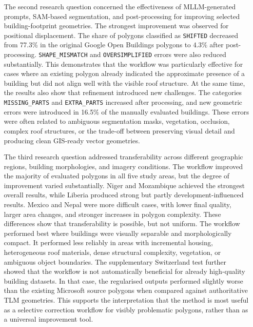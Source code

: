 The second research question concerned the effectiveness of MLLM-generated prompts, SAM-based segmentation, and post-processing for improving selected building-footprint geometries. The strongest improvement was observed for positional displacement. The share of polygons classified as \texttt{SHIFTED} decreased from 77.3\% in the original Google Open Buildings polygons to 4.3\% after post-processing. \texttt{SHAPE\_MISMATCH} and \texttt{OVERSIMPLIFIED} errors were also reduced substantially. This demonstrates that the workflow was particularly effective for cases where an existing polygon already indicated the approximate presence of a building but did not align well with the visible roof structure. At the same time, the results also show that refinement introduced new challenges. The categories \texttt{MISSING\_PARTS} and \texttt{EXTRA\_PARTS} increased after processing, and new geometric errors were introduced in 16.5\% of the manually evaluated buildings. These errors were often related to ambiguous segmentation masks, vegetation, occlusion, complex roof structures, or the trade-off between preserving visual detail and producing clean GIS-ready vector geometries.

The third research question addressed transferability across different geographic regions, building morphologies, and imagery conditions. The workflow improved the majority of evaluated polygons in all five study areas, but the degree of improvement varied substantially. Niger and Mozambique achieved the strongest overall results, while Liberia produced strong but partly development-influenced results. Mexico and Nepal were more difficult cases, with lower final quality, larger area changes, and stronger increases in polygon complexity. These differences show that transferability is possible, but not uniform. The workflow performed best where buildings were visually separable and morphologically compact. It performed less reliably in areas with incremental housing, heterogeneous roof materials, dense structural complexity, vegetation, or ambiguous object boundaries. The supplementary Switzerland test further showed that the workflow is not automatically beneficial for already high-quality building datasets. In that case, the regularised outputs performed slightly worse than the existing Microsoft source polygons when compared against authoritative TLM geometries. This supports the interpretation that the method is most useful as a selective correction workflow for visibly problematic polygons, rather than as a universal improvement tool.

